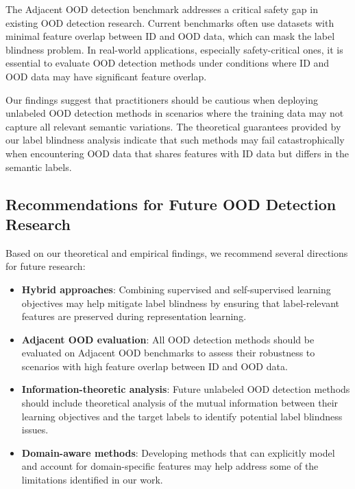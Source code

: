 The Adjacent OOD detection benchmark addresses a critical safety gap in existing OOD detection research. Current benchmarks often use datasets with minimal feature overlap between ID and OOD data, which can mask the label blindness problem. In real-world applications, especially safety-critical ones, it is essential to evaluate OOD detection methods under conditions where ID and OOD data may have significant feature overlap.

Our findings suggest that practitioners should be cautious when deploying unlabeled OOD detection methods in scenarios where the training data may not capture all relevant semantic variations. The theoretical guarantees provided by our label blindness analysis indicate that such methods may fail catastrophically when encountering OOD data that shares features with ID data but differs in the semantic labels.

\subsection{Recommendations for Future OOD Detection Research}

Based on our theoretical and empirical findings, we recommend several directions for future research:

\begin{itemize}
\item \textbf{Hybrid approaches}: Combining supervised and self-supervised learning objectives may help mitigate label blindness by ensuring that label-relevant features are preserved during representation learning.

\item \textbf{Adjacent OOD evaluation}: All OOD detection methods should be evaluated on Adjacent OOD benchmarks to assess their robustness to scenarios with high feature overlap between ID and OOD data.

\item \textbf{Information-theoretic analysis}: Future unlabeled OOD detection methods should include theoretical analysis of the mutual information between their learning objectives and the target labels to identify potential label blindness issues.

\item \textbf{Domain-aware methods}: Developing methods that can explicitly model and account for domain-specific features may help address some of the limitations identified in our work.
\end{itemize}

